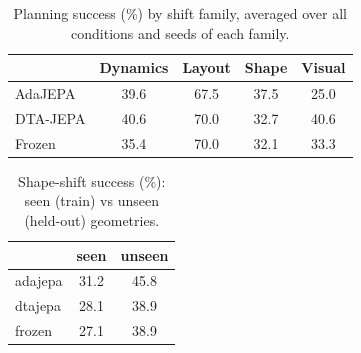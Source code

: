 \begin{table}[t]
\centering
\caption{Planning success (\%) by shift family, averaged over all conditions and seeds of each family.}
\label{tab:family}
\begin{tabular}{lcccc}
\toprule
 & Dynamics & Layout & Shape & Visual \\
\midrule
AdaJEPA & 39.6 & 67.5 & 37.5 & 25.0 \\
DTA-JEPA & 40.6 & 70.0 & 32.7 & 40.6 \\
Frozen & 35.4 & 70.0 & 32.1 & 33.3 \\
\bottomrule
\end{tabular}
\end{table}

\begin{table}[t]
\centering
\caption{Shape-shift success (\%): seen (train) vs unseen (held-out) geometries.}
\label{tab:seenunseen}
\begin{tabular}{lcc}
\toprule
 & seen & unseen \\
\midrule
adajepa & 31.2 & 45.8 \\
dtajepa & 28.1 & 38.9 \\
frozen & 27.1 & 38.9 \\
\bottomrule
\end{tabular}
\end{table}
